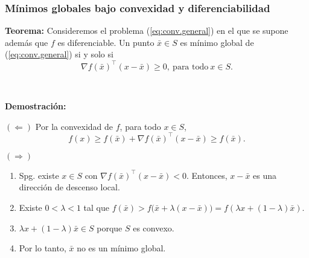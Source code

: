 \documentclass{beamer}
\begin{document}
\begin{frame}
\frametitle{Mínimos globales bajo convexidad y diferenciabilidad}

{\bf Teorema:} Consideremos el problema (\ref{eq:conv.general}) en el que se supone además que $f$ es diferenciable.
Un punto $\bar{x}\in S$ es mínimo global de (\ref{eq:conv.general}) si y solo si 
\[
\nabla f(\bar{x})^\top (x-\bar{x}) \geq 0, \ \mbox{para todo}\ x\in S. 
\]

\

{\scriptsize
{\bf Demostración:}

 $(\Leftarrow)$   Por la convexidad de $f$, para todo $x\in S$,
 \[
 f(x)\geq f(\bar{x}) + \nabla f(\bar{x})^\top (x-\bar{x}) \geq f(\bar{x}).
 \]

$(\Rightarrow)$
\begin{enumerate}
\item  Spg. existe $x\in S$ con $\nabla f(\bar{x})^\top (x-\bar{x})<0$. Entonces, $x-\bar{x}$ es una dirección de descenso local.
\item Existe $0<\lambda <1$ tal que $f(\bar{x})>f\big(\bar{x}+\lambda (x-\bar{x})\big)=
f(\lambda x + (1-\lambda)\bar{x})$. 
\item $\lambda x + (1-\lambda)\bar{x} \in S$ porque $S$ es convexo.
\item Por lo tanto, $\bar{x}$ no es un mínimo global. 
\end{enumerate}
}
\end{frame}
\end{document}
